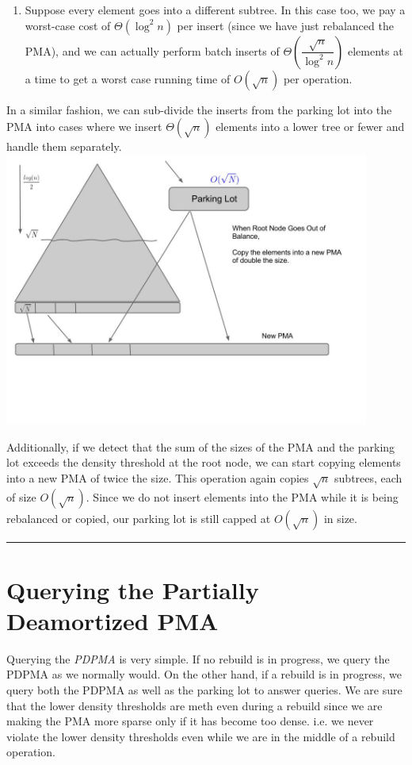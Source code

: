 \documentclass{article}
\newenvironment{proof}{{\bf Proof:  }}{\hfill\rule{2mm}{2mm}}
\begin{document}
\begin{proof}
\begin{enumerate}
\item Suppose every element goes into a different subtree. In this
  case too, we pay a worst-case cost of $\Theta(\log^2{n})$ per insert
  (since we have just rebalanced the PMA), and we can actually perform
  batch inserts of $\Theta\left(\dfrac{\sqrt{n}}{\log^2{n}}\right)$ elements at a time to get a
  worst case running time of $O(\sqrt{n})$ per operation.

\end{enumerate}

In a similar fashion, we can sub-divide the inserts from the parking
lot into the PMA into cases where we insert $\Theta(\sqrt{n})$
elements into a lower tree or fewer and handle them separately. \\

\includegraphics[width=120mm]{img2.jpg}

Additionally, if we detect that the sum of the sizes of the PMA and
the parking lot exceeds the density threshold at the root node, we can
start copying elements into a new PMA of twice the size. This
operation again copies $\sqrt{n}$ subtrees, each of size
$O(\sqrt{n})$. Since we do not insert elements into the PMA while it
is being rebalanced or copied, our parking lot is still capped at
$O(\sqrt{n})$ in size.

\end{proof}

\section{Querying the Partially Deamortized PMA}

Querying the \textit{PDPMA} is very simple. If no rebuild is in
progress, we query the PDPMA as we normally would. On the other hand,
if a rebuild is in progress, we query both the PDPMA as well as the
parking lot to answer queries. We are sure that the lower density
thresholds are meth even during a rebuild since we are making the PMA
more sparse only if it has become too dense. i.e. we never violate the
lower density thresholds even while we are in the middle of a rebuild
operation.
\end{document}
